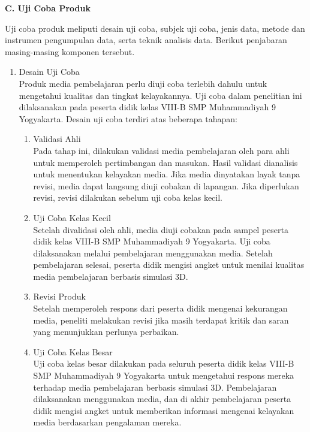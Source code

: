 \textbf{C. Uji Coba Produk}

\hspace*{1cm}Uji coba produk meliputi desain uji coba, subjek uji coba, jenis data, metode dan instrumen pengumpulan data, serta teknik analisis data. Berikut penjabaran masing-masing komponen tersebut.
\begin{enumerate}
    \item Desain Uji Coba\\
    \hspace*{1cm}Produk media pembelajaran perlu diuji coba terlebih dahulu untuk mengetahui kualitas dan tingkat kelayakannya. Uji coba dalam penelitian ini dilaksanakan pada peserta didik kelas VIII-B SMP Muhammadiyah 9 Yogyakarta. Desain uji coba terdiri atas beberapa tahapan:
    \begin{enumerate}
        \item Validasi Ahli\\
        \hspace*{1cm}Pada tahap ini, dilakukan validasi media pembelajaran oleh para ahli untuk memperoleh pertimbangan dan masukan. Hasil validasi dianalisis untuk menentukan kelayakan media. Jika media dinyatakan layak tanpa revisi, media dapat langsung diuji cobakan di lapangan. Jika diperlukan revisi, revisi dilakukan sebelum uji coba kelas kecil.
        \item Uji Coba Kelas Kecil\\
        \hspace*{1cm}Setelah divalidasi oleh ahli, media diuji cobakan pada sampel peserta didik kelas VIII-B SMP Muhammadiyah 9 Yogyakarta. Uji coba dilaksanakan melalui pembelajaran menggunakan media. Setelah pembelajaran selesai, peserta didik mengisi angket untuk menilai kualitas media pembelajaran berbasis simulasi 3D.
        \item Revisi Produk\\
        \hspace*{1cm}Setelah memperoleh respons dari peserta didik mengenai kekurangan media, peneliti melakukan revisi jika masih terdapat kritik dan saran yang menunjukkan perlunya perbaikan.
        \item Uji Coba Kelas Besar\\
        \hspace*{1cm}Uji coba kelas besar dilakukan pada seluruh peserta didik kelas VIII-B SMP Muhammadiyah 9 Yogyakarta untuk mengetahui respons mereka terhadap media pembelajaran berbasis simulasi 3D. Pembelajaran dilaksanakan menggunakan media, dan di akhir pembelajaran peserta didik mengisi angket untuk memberikan informasi mengenai kelayakan media berdasarkan pengalaman mereka.
    \end{enumerate}


\end{enumerate}
